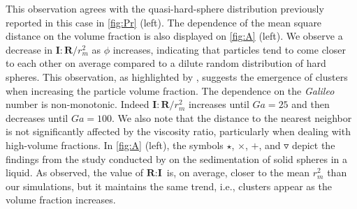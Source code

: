 This observation agrees with the quasi-hard-sphere distribution previously reported in this case in \ref{fig:Pr} (left).
The dependence of the mean square distance on the volume fraction is also displayed on \ref{fig:A} (left). 
We observe a decrease in $\textbf{I}:\textbf{R}/r_m^2$ as $\phi$ increases, indicating that particles tend to come closer to each other on average compared to a dilute random distribution of hard spheres. 
This observation, as highlighted by \citet{zhang2023evolution}, suggests the emergence of clusters when increasing the particle volume fraction. 
The dependence on the \textit{Galileo} number is non-monotonic. 
Indeed $\textbf{I}:\textbf{R}/r_m^2$ increases until $Ga = 25$ and then decreases until $Ga = 100$. We also note that the distance to the nearest neighbor is not significantly affected by the viscosity ratio, particularly when dealing with high-volume fractions. 
In \ref{fig:A} (left), the symbols $\pmb\star$, $\pmb\times$, $\pmb +$, and $\pmb\triangledown$ depict the findings from the study conducted by \citet{zhang2023evolution} on the sedimentation of solid spheres in a liquid.
As observed, the value of $\textbf{R}:\textbf{I}$ is, on average, closer to the mean $r_m^2$ than our simulations, but it maintains the same trend, i.e., clusters appear as the volume fraction increases.
 
